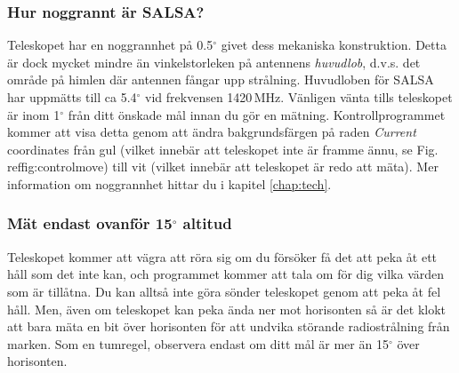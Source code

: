 \subsubsection{Hur noggrannt är SALSA?}
Teleskopet har en noggrannhet på 0.5$^\circ$ givet dess mekaniska konstruktion.
Detta är dock mycket mindre än vinkelstorleken på antennens \emph{huvudlob}, d.v.s.
det område på himlen där antennen fångar upp strålning. Huvudloben för SALSA
har uppmätts till ca 5.4$^\circ$ vid frekvensen 1420\,MHz.  Vänligen vänta tills
teleskopet är inom 1$^\circ$ från ditt önskade mål innan du gör en mätning. 
Kontrollprogrammet kommer att visa detta genom att ändra bakgrundsfärgen
på raden \emph{Current} coordinates från gul (vilket innebär att teleskopet
inte är framme ännu, se Fig. ref{fig:controlmove}) till vit (vilket innebär att
teleskopet är redo att mäta). Mer information om noggrannhet hittar du i
kapitel \ref{chap:tech}.

\subsubsection{Mät endast ovanför 15$^\circ$ altitud}
Teleskopet kommer att vägra att röra sig om du försöker få det att peka
åt ett håll som det inte kan, och programmet kommer att tala om för dig
vilka värden som är tillåtna. Du kan alltså inte göra sönder teleskopet genom
att peka åt fel håll. Men, även om teleskopet kan peka ända ner mot horisonten så
är det klokt att bara mäta en bit över horisonten för att undvika störande
radiostrålning från marken. Som en tumregel, observera endast om ditt mål
är mer än 15$^\circ$ över horisonten. 


